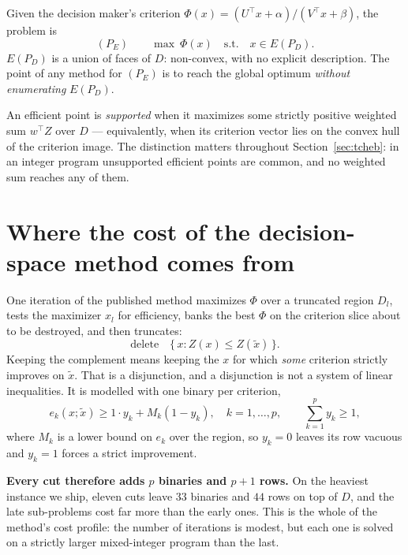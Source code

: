\documentclass[11pt,a4paper]{article}
\newcommand{\Z}{Z}
\newcommand{\Dset}{D}
\newcommand{\E}{E(P_{\Dset})}
\begin{document}
Given the decision maker's criterion
$\Phi(x) = (U^{\top}x + \alpha)/(V^{\top}x + \beta)$, the problem is
\begin{equation}
  (P_E) \qquad \max \ \Phi(x) \quad \text{s.t.} \quad x \in \E .
\end{equation}
$\E$ is a union of faces of $\Dset$: non-convex, with no explicit description.
The point of any method for $(P_E)$ is to reach the global optimum
\emph{without enumerating} $\E$.

An efficient point is \emph{supported} when it maximizes some strictly positive
weighted sum $w^{\top}\Z$ over $\Dset$ --- equivalently, when its criterion
vector lies on the convex hull of the criterion image. The distinction matters
throughout Section~\ref{sec:tcheb}: in an integer program unsupported efficient
points are common, and no weighted sum reaches any of them.

\section{Where the cost of the decision-space method comes from}
\label{sec:cost}

One iteration of the published method maximizes $\Phi$ over a truncated region
$\Dset_l$, tests the maximizer $x_l$ for efficiency, banks the best $\Phi$ on
the criterion slice about to be destroyed, and then truncates:
\begin{equation}\label{eq:cut}
  \text{delete} \quad \{\, x : \Z(x) \leqslant \Z(\tilde{x}) \,\} .
\end{equation}
Keeping the complement means keeping the $x$ for which \emph{some} criterion
strictly improves on $\tilde{x}$. That is a disjunction, and a disjunction is
not a system of linear inequalities. It is modelled with one binary per
criterion,
\begin{equation}\label{eq:bigM}
  e_k(x;\tilde{x}) \geqslant 1 \cdot y_k + M_k (1 - y_k), \quad k = 1,\dots,p,
  \qquad \sum_{k=1}^{p} y_k \geqslant 1 ,
\end{equation}
where $M_k$ is a lower bound on $e_k$ over the region, so $y_k = 0$ leaves its
row vacuous and $y_k = 1$ forces a strict improvement.

\textbf{Every cut therefore adds $p$ binaries and $p+1$ rows.} On the heaviest
instance we ship, eleven cuts leave $33$ binaries and $44$ rows on top of
$\Dset$, and the late sub-problems cost far more than the early ones. This is
the whole of the method's cost profile: the number of iterations is modest, but
each one is solved on a strictly larger mixed-integer program than the last.
\end{document}
